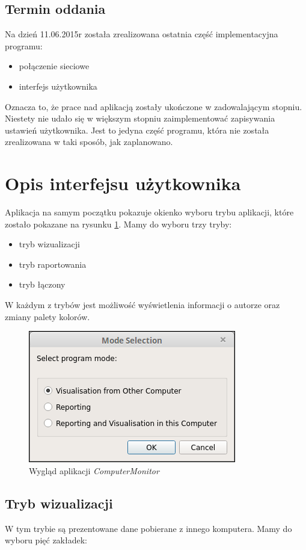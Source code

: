 \documentclass[a4paper]{article}
\begin{document}
\subsection{Termin oddania}
Na dzień 11.06.2015r została zrealizowana ostatnia część implementacyjna programu:
	\begin{itemize}
		\item połączenie sieciowe
		\item interfejs użytkownika
	\end{itemize}
Oznacza to, że prace nad aplikacją zostały ukończone w zadowalającym stopniu. 
Niestety nie udało się w większym stopniu zaimplementować zapisywania ustawień użytkownika. Jest to jedyna
część programu, która nie została zrealizowana w taki sposób, jak zaplanowano.



\section{Opis interfejsu użytkownika}

Aplikacja na samym początku pokazuje okienko wyboru trybu aplikacji, które zostało pokazane na rysunku \ref{okno_wyboru_trybu}. Mamy do wyboru trzy tryby:
\begin{itemize}
			\item tryb wizualizacji
			\item tryb raportowania
			\item tryb łączony
\end{itemize}
W każdym z trybów jest możliwość wyświetlenia informacji o autorze oraz zmiany palety kolorów.

\begin{figure}[H]
	\centering
	\includegraphics[height=0.15\paperheight]{img/oknoWyboruTrybu.png}
	\caption{Wygląd aplikacji \textit{ComputerMonitor}}
	\label{okno_wyboru_trybu}
\end{figure}


\subsection{Tryb wizualizacji}
W tym trybie są prezentowane dane pobierane z innego komputera. Mamy do wyboru pięć zakładek:
\end{document}
